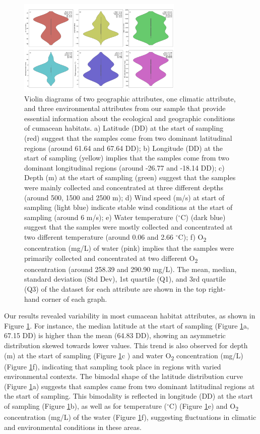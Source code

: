 \begin{figure}[htbp]
    \centering
    \includegraphics[width=0.7\textwidth]{figure1.jpg}
    \caption{Violin diagrams of two geographic attributes, one climatic attribute, and three environmental attributes from our sample that provide essential information about the ecological and geographic conditions of cumacean habitats. a) Latitude (DD) at the start of sampling (red) suggest that the samples come from two dominant latitudinal regions (around 61.64 and 67.64 DD); b) Longitude (DD) at the start of sampling (yellow) implies that the samples come from two dominant longitudinal regions (around -26.77 and -18.14 DD); c) Depth (m) at the start of sampling (green) suggest that the samples were mainly collected and concentrated at three different depths (around 500, 1500 and 2500 m); d) Wind speed (m/s) at start of sampling (light blue) indicate stable wind conditions at the start of sampling (around 6 m/s); e) Water temperature ($^\circ$C) (dark blue) suggest that the samples were mostly collected and concentrated at two different temperature (around 0.06 and 2.66 $^\circ$C); f) O\textsubscript{2} concentration (mg/L) of water (pink) implies that the samples were primarily collected and concentrated at two different O\textsubscript{2} concentration (around 258.39 and 290.90 mg/L). The mean, median, standard deviation (Std Dev), 1st quartile (Q1), and 3rd quartile (Q3) of the dataset for each attribute are shown in the top right-hand corner of each graph. \label{fig:fig2}}
\end{figure}

Our results revealed variability in most cumacean habitat attributes, as shown in Figure \ref{fig:fig2}. For instance, the median latitude at the start of sampling (Figure \ref{fig:fig2}a, 67.15 DD) is higher than the mean (64.83 DD), showing an asymmetric distribution skewed towards lower values. This trend is also observed for depth (m) at the start of sampling (Figure \ref{fig:fig2}c ) and water O\textsubscript{2} concentration (mg/L) (Figure \ref{fig:fig2}f), indicating that sampling took place in regions with varied environmental contexts. The bimodal shape of the latitude distribution curve (Figure \ref{fig:fig2}a) suggests that samples came from two dominant latitudinal regions at the start of sampling. This bimodality is reflected in longitude (DD) at the start of sampling (Figure \ref{fig:fig2}b), as well as for temperature ($^\circ$C) (Figure \ref{fig:fig2}e) and O\textsubscript{2} concentration (mg/L) of the water (Figure \ref{fig:fig2}f), suggesting fluctuations in climatic and environmental conditions in these areas.  

